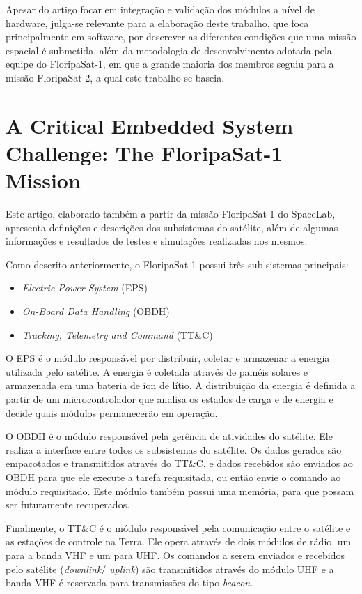 Apesar do artigo focar em integração e validação dos módulos a nível de hardware, julga-se relevante para a elaboração deste trabalho, que foca principalmente em software, por descrever as diferentes condições que uma missão espacial é submetida, além da metodologia de desenvolvimento adotada pela equipe do FloripaSat-1, em que a grande maioria dos membros seguiu para a missão FloripaSat-2, a qual este trabalho se baseia.

\section{A Critical Embedded System Challenge: The FloripaSat-1 Mission \texorpdfstring{\\\cite{marcelino2020-1}}{} }
\label{relacionados:marcelino2020-1}
Este artigo, elaborado também a partir da missão FloripaSat-1 do SpaceLab, apresenta definições e descrições dos subsistemas do satélite, além de algumas informações e resultados de testes e simulações realizadas nos mesmos.

Como descrito anteriormente, o FloripaSat-1 possui três sub sistemas principais:

\begin{itemize}
    \item \textit{Electric Power System} (EPS)
    \item \textit{On-Board Data Handling} (OBDH)
    \item \textit{Tracking, Telemetry and Command} (TT\&C)
\end{itemize}

O EPS é o módulo responsável por distribuir, coletar e armazenar a energia utilizada pelo satélite. A energia é coletada através de painéis solares e armazenada em uma bateria de íon de lítio. A distribuição da energia é definida a partir de um microcontrolador que analisa os estados de carga e de energia e decide quais módulos permanecerão em operação.

O OBDH é o módulo responsável pela gerência de atividades do satélite. Ele realiza a interface entre todos os subsistemas do satélite. Os dados gerados são empacotados e transmitidos através do TT\&C, e dados recebidos são enviados ao OBDH para que ele execute a tarefa requisitada, ou então envie o comando ao módulo requisitado. Este módulo também possui uma memória, para que possam ser futuramente recuperados.

Finalmente, o TT\&C é o módulo responsável pela comunicação entre o satélite e as estações de controle na Terra. Ele opera através de dois módulos de rádio, um para a banda VHF e um para UHF. Os comandos a serem enviados e recebidos pelo satélite (\textit{downlink}/ \textit{uplink}) são transmitidos através do módulo UHF e a banda VHF é reservada para transmissões do tipo \textit{beacon}.

